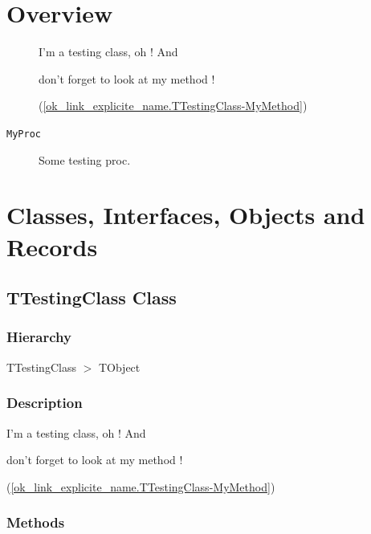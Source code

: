 \documentclass{report}
\newif\ifpdf
\begin{document}
\section{Overview}
\begin{description}
\item[\texttt{\begin{ttfamily}TTestingClass\end{ttfamily} Class}]I'm a testing class, oh ! And \begin{ttfamily}don't forget to look at my method !\end{ttfamily}(\ref{ok_link_explicite_name.TTestingClass-MyMethod})
\end{description}
\begin{description}
\item[\texttt{MyProc}]Some testing proc.
\end{description}
\section{Classes, Interfaces, Objects and Records}
\ifpdf
\subsection*{\large{\textbf{TTestingClass Class}}\normalsize\hspace{1ex}\hrulefill}
\else
\subsection*{TTestingClass Class}
\fi
\label{ok_link_explicite_name.TTestingClass}
\subsubsection*{\large{\textbf{Hierarchy}}\normalsize\hspace{1ex}\hfill}
TTestingClass {$>$} TObject
\subsubsection*{\large{\textbf{Description}}\normalsize\hspace{1ex}\hfill}
I'm a testing class, oh ! And \begin{ttfamily}don't forget to look at my method !\end{ttfamily}(\ref{ok_link_explicite_name.TTestingClass-MyMethod})\subsubsection*{\large{\textbf{Methods}}\normalsize\hspace{1ex}\hfill}
\end{document}
